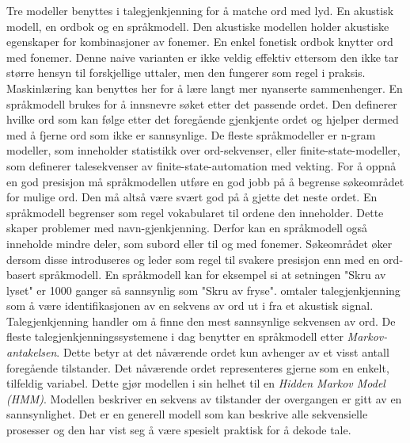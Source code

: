 Tre modeller benyttes i talegjenkjenning for å matche ord med lyd. En akustisk modell, en ordbok og en språkmodell. Den akustiske modellen holder akustiske egenskaper for kombinasjoner av fonemer. En enkel fonetisk ordbok knytter ord med fonemer. Denne naive varianten er ikke veldig effektiv ettersom den ikke tar større hensyn til forskjellige uttaler, men den fungerer som regel i praksis. Maskinlæring kan benyttes her for å lære langt mer nyanserte sammenhenger. En språkmodell brukes for å innsnevre søket etter det passende ordet. Den definerer hvilke ord som kan følge etter det foregående gjenkjente ordet og hjelper dermed med å fjerne ord som ikke er sannsynlige. De fleste språkmodeller er n-gram modeller, som inneholder statistikk over ord-sekvenser, eller finite-state-modeller, som definerer talesekvenser av finite-state-automation med vekting. For å oppnå en god presisjon må språkmodellen utføre en god jobb på å begrense søkeområdet for mulige ord. Den må altså være svært god på å gjette det neste ordet. En språkmodell begrenser som regel vokabularet til ordene den inneholder. Dette skaper problemer med navn-gjenkjenning. Derfor kan en språkmodell også inneholde mindre deler, som subord eller til og med fonemer. Søkeområdet øker dersom disse introduseres og leder som regel til svakere presisjon enn med en ord-basert språkmodell. En språkmodell kan for eksempel si at setningen "Skru av lyset" er 1000 ganger så sannsynlig som "Skru av fryse". \citet{russellnorvig10} omtaler talegjenkjenning som å være identifikasjonen av en sekvens av ord ut i fra et akustisk signal. Talegjenkjenning handler om å finne den mest sannsynlige sekvensen av ord. De fleste talegjenkjenningssystemene i dag benytter en språkmodell etter \emph{Markov-antakelsen}. Dette betyr at det nåværende ordet kun avhenger av et visst antall foregående tilstander. Det nåværende ordet representeres gjerne som en enkelt, tilfeldig variabel. Dette gjør modellen i sin helhet til en \emph{Hidden Markov Model (HMM)}. Modellen beskriver en sekvens av tilstander der overgangen er gitt av en sannsynlighet. Det er en generell modell som kan beskrive alle sekvensielle prosesser og den har vist seg å være spesielt praktisk for å dekode tale. 
